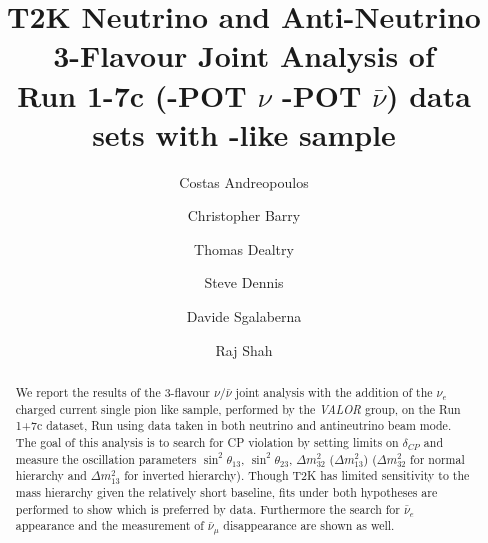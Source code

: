 %
%

\begin{frontmatter}

\title{
  T2K Neutrino and Anti-Neutrino 3-Flavour Joint Analysis of  \\
  Run 1-7c (\TotalPotNuRunOneSevenC-POT $\nu$  \TotalPotNuBarRunOneSevenC-POT $\bar{\nu}$)
  data sets with \nueCConepi{}-like sample
}

\vspace*{0.7cm}

\author[RAL,LIV]  {Costas Andreopoulos}
\author[LIV]  {Christopher Barry}
\author[LANCS]  {Thomas Dealtry}
\author[RAL,LIV]  {Steve Dennis\\}
\author[GEN]     {Davide Sgalaberna}
\author[RAL,OXF]  {Raj Shah}

\address[RAL]   {Science \& Technology Facilities Council (STFC), Rutherford Appleton Laboratory,\\ Harwell Oxford Campus, OX11 0QX, UK}
\address[LIV]   {University of Liverpool, Physics Department,\\ Liverpool, L69 7ZE, UK} 
\address[OXF]   {University of Oxford, Subdepartment of Particle Physics,\\ Oxford, OX1 3RH, UK}
\address[LANCS] {Lancaster University, Physics Department,\\ Lancaster, LA1 4YB, UK}
\address[GEN]  {University of Geneva, Departement de physique nucleaire et corpusculaire,\\ 1211 Geneve, Switzerland}

%
%

\begin{abstract}

We report the results of the
3-flavour $\nu/\bar{\nu}$ joint analysis with the addition of the \(\nu_{e}\) charged current single pion like sample, performed by the {\em VALOR} group,
on the Run 1+7c dataset, Run 
using data taken in both neutrino and antineutrino beam mode.
The goal of this analysis is 
to search for CP violation by setting limits on $\delta_{CP}$
and measure the oscillation parameters
$\sin^2 \theta_{13}$, $\sin^2 \theta_{23}$, $\Delta m^2_{32}$ ($\Delta m^2_{13}$) 
($\Delta m^2_{32}$ for normal hierarchy and $\Delta m^2_{13}$ for inverted hierarchy).
Though T2K has limited sensitivity to the mass hierarchy given the relatively short baseline,
fits under both hypotheses are performed to show which is preferred by data.
Furthermore the search for $\bar{\nu}_e$ appearance and 
the measurement of $\bar{\nu}_{\mu}$ disappearance are shown as well.


\end{abstract}
\end{frontmatter}
